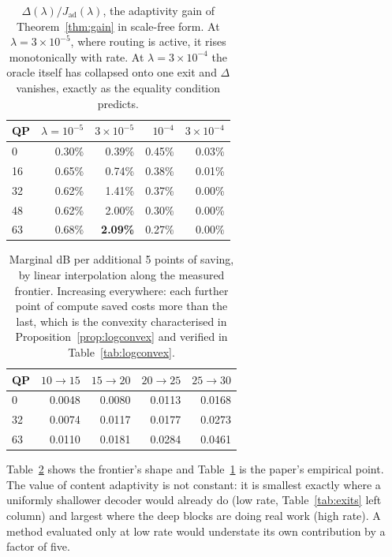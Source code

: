 \documentclass[10pt]{article}
\theoremstyle{plain}
\theoremstyle{definition}
\begin{document}
\begin{table}[h]\centering\small
\caption{$\Delta(\lambda)/J_{\mathrm{ad}}(\lambda)$, the adaptivity gain of
Theorem~\ref{thm:gain} in scale-free form. At $\lambda=3\!\times\!10^{-5}$,
where routing is active, it rises monotonically with rate. At
$\lambda=3\!\times\!10^{-4}$ the oracle itself has collapsed onto one exit and
$\Delta$ vanishes, exactly as the equality condition predicts.}
\label{tab:delta}
\begin{tabular}{lrrrr}
\toprule
QP & $\lambda{=}10^{-5}$ & $3{\times}10^{-5}$ & $10^{-4}$ & $3{\times}10^{-4}$\\
\midrule
0  & 0.30\% & 0.39\% & 0.45\% & 0.03\% \\
16 & 0.65\% & 0.74\% & 0.38\% & 0.01\% \\
32 & 0.62\% & 1.41\% & 0.37\% & 0.00\% \\
48 & 0.62\% & 2.00\% & 0.30\% & 0.00\% \\
63 & 0.68\% & \textbf{2.09\%} & 0.27\% & 0.00\% \\
\bottomrule
\end{tabular}
\end{table}

\begin{table}[h]\centering\small
\caption{Marginal dB per additional 5 points of saving, by linear interpolation
along the measured frontier. Increasing everywhere: each further point of
compute saved costs more than the last, which is the convexity characterised in
Proposition~\ref{prop:logconvex} and verified in Table~\ref{tab:logconvex}.}
\label{tab:marginal}
\begin{tabular}{lrrrr}
\toprule
QP & $10\!\to\!15$ & $15\!\to\!20$ & $20\!\to\!25$ & $25\!\to\!30$ \\
\midrule
0  & 0.0048 & 0.0080 & 0.0113 & 0.0168 \\
32 & 0.0074 & 0.0117 & 0.0177 & 0.0273 \\
63 & 0.0110 & 0.0181 & 0.0284 & 0.0461 \\
\bottomrule
\end{tabular}
\end{table}

Table~\ref{tab:marginal} shows the frontier's shape and Table~\ref{tab:delta} is the paper's empirical point. The value of content
adaptivity is not constant: it is smallest exactly where a uniformly shallower
decoder would already do (low rate, Table~\ref{tab:exits} left column) and
largest where the deep blocks are doing real work (high rate). A method
evaluated only at low rate would understate its own contribution by a factor of
five.
\end{document}
